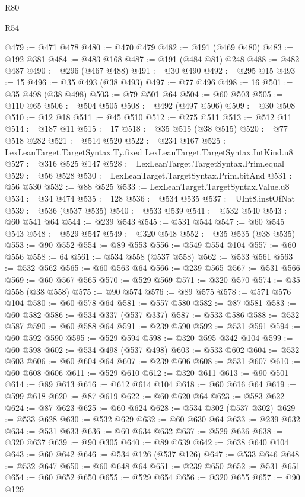 \begin{lexlean}{R80}
\begin{lexlean}{R54}
\begin{coremodule}
{{{{{{{{{{{{{{{{{{{{{{{{{{{{{{{{{{{{{{{{{{{{{{{{{{@479 := @471 @478
@480 := @470 @479
@482 := @191 (@469 @480)
@483 := @192 @381
@484 := @483 @168
@487 := @191 (@484 @81) @248
@488 := @482 @487
@490 := @296 (@467 @488)
@491 := @30 @490
@492 := @295 @15
@493 := 15
@496 := @35 @493 (@38 @493)
@497 := @77 @496
@498 := 16
@501 := @35 @498 (@38 @498)
@503 := @79 @501 @64
@504 := @60 @503
@505 := @110 @65
@506 := @504 @505
@508 := @492 (@497 @506)
@509 := @30 @508
@510 := @12 @18
@511 := @45 @510
@512 := @275 @511
@513 := @512 @11
@514 := @187 @11
@515 := 17
@518 := @35 @515 (@38 @515)
@520 := @77 @518 @282
@521 := @514 @520
@522 := @234 @167
@525 := LexLeanTarget.TargetSyntax.Ty.fixed LexLeanTarget.TargetSyntax.IntKind.u8
@527 := @316 @525 @147
@528 := LexLeanTarget.TargetSyntax.Prim.equal
@529 := @56 @528
@530 := LexLeanTarget.TargetSyntax.Prim.bitAnd
@531 := @56 @530
@532 := @88 @525
@533 := LexLeanTarget.TargetSyntax.Value.u8
@534 := @34 @474
@535 := 128
@536 := @534 @535
@537 := UInt8.instOfNat
@539 := @536 (@537 @535)
@540 := @533 @539
@541 := @532 @540
@543 := @60 @541 @64
@544 := @239 @543
@545 := @531 @544
@547 := @60 @545 @543
@548 := @529 @547
@549 := @320 @548
@552 := @35 @535 (@38 @535)
@553 := @90 @552
@554 := @89 @553
@556 := @549 @554 @104
@557 := @60 @556
@558 := 64
@561 := @534 @558 (@537 @558)
@562 := @533 @561
@563 := @532 @562
@565 := @60 @563 @64
@566 := @239 @565
@567 := @531 @566
@569 := @60 @567 @565
@570 := @529 @569
@571 := @320 @570
@574 := @35 @558 (@38 @558)
@575 := @90 @574
@576 := @89 @575
@578 := @571 @576 @104
@580 := @60 @578 @64
@581 := @557 @580
@582 := @87 @581
@583 := @60 @582
@586 := @534 @337 (@537 @337)
@587 := @533 @586
@588 := @532 @587
@590 := @60 @588 @64
@591 := @239 @590
@592 := @531 @591
@594 := @60 @592 @590
@595 := @529 @594
@598 := @320 @595 @342 @104
@599 := @60 @598
@602 := @534 @498 (@537 @498)
@603 := @533 @602
@604 := @532 @603
@606 := @60 @604 @64
@607 := @239 @606
@608 := @531 @607
@610 := @60 @608 @606
@611 := @529 @610
@612 := @320 @611
@613 := @90 @501
@614 := @89 @613
@616 := @612 @614 @104
@618 := @60 @616 @64
@619 := @599 @618
@620 := @87 @619
@622 := @60 @620 @64
@623 := @583 @622
@624 := @87 @623
@625 := @60 @624
@628 := @534 @302 (@537 @302)
@629 := @533 @628
@630 := @532 @629
@632 := @60 @630 @64
@633 := @239 @632
@634 := @531 @633
@636 := @60 @634 @632
@637 := @529 @636
@638 := @320 @637
@639 := @90 @305
@640 := @89 @639
@642 := @638 @640 @104
@643 := @60 @642
@646 := @534 @126 (@537 @126)
@647 := @533 @646
@648 := @532 @647
@650 := @60 @648 @64
@651 := @239 @650
@652 := @531 @651
@654 := @60 @652 @650
@655 := @529 @654
@656 := @320 @655
@657 := @90 @129
}}}}}}}}}}}}}}}}}}}}}}}}}}}}}}}}}}}}}}}}}}}}}}}}}}
\end{coremodule}
\end{lexlean}
\end{lexlean}
